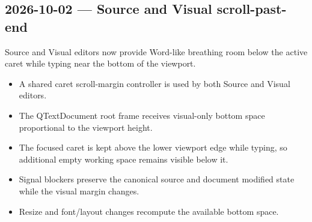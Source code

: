 \documentclass[a4paper]{article}
\title{}
\date{}
\author{Mohammad Rahmani}
\begin{document}
   \maketitle

   \begin{preview}
      \section*{2026-10-02 --- Source and Visual scroll-past-end}

      Source and Visual editors now provide Word-like breathing room below the
      active caret while typing near the bottom of the viewport.

      \begin{itemize}
         \item A shared caret scroll-margin controller is used by both Source
               and Visual editors.
         \item The QTextDocument root frame receives visual-only bottom space
               proportional to the viewport height.
         \item The focused caret is kept above the lower viewport edge while
               typing, so additional empty working space remains visible below it.
         \item Signal blockers preserve the canonical source and document
               modified state while the visual margin changes.
         \item Resize and font/layout changes recompute the available bottom space.
      \end{itemize}
   \end{preview}

   
   
\end{document}
